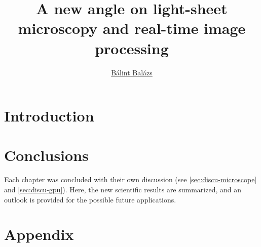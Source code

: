 \documentclass{diploma_style}
\author{\href{mailto:balint.balazs@embl.de}{Bálint Balázs}}
\title{A new angle on light-sheet microscopy and real-time image processing}
\begin{document}
\pagestyle{plain}

\maketitle
{}





\tableofcontents
\pagestyle{fancy}


\listoffigures
{}

\listoftables
{}

\glsaddall[types={\acronymtype}]
\printglossary[type=\acronymtype, title=List of Abbreviations, toctitle=List of Abbreviations]



\cleardoublepage
\setcounter{page}{1}

\chapter*{Introduction}

\cleardoublepage












\chapter{Conclusions}

Each chapter was concluded with their own discussion (see \autoref{sec:discu-microscope} and \autoref{sec:discu-gpu}). Here, the new scientific results are summarized, and an outlook is provided for the possible future applications.

\graphicspath{{./}}
\label{ch:discussion}




\chapter*{Appendix}
\setcounter{table}{0}
\setcounter{figure}{0}
\setcounter{section}{0}
\renewcommand{\thesection}{\Alph{section}}
\renewcommand{\thetable}{\Alph{section}\arabic{table}}
\renewcommand{\thefigure}{\Alph{section}\arabic{figure}}
\end{document}
